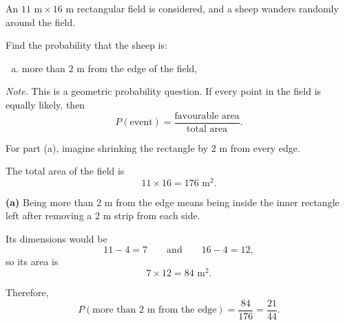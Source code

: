 \begin{problem}
An $11\text{ m}\times 16\text{ m}$ rectangular field is considered, and a sheep wanders randomly around the field.

Find the probability that the sheep is:
\begin{enumerate}[(a)]
  \item more than $2\text{ m}$ from the edge of the field,
\end{enumerate}

\noindent\textit{Note.} This is a geometric probability question. If every point in the field is equally likely, then
\[
P(\text{event})=\frac{\text{favourable area}}{\text{total area}}.
\]

\begin{center}
\end{center}
\end{problem}

\begin{hint}
For part (a), imagine shrinking the rectangle by $2\text{ m}$ from every edge.
\end{hint}

\begin{solution}
The total area of the field is
\[
11\times 16=176\text{ m}^2.
\]

\textbf{(a)} Being more than $2\text{ m}$ from the edge means being inside the inner rectangle left after removing a $2\text{ m}$ strip from each side.

Its dimensions would be
\[
11-4=7
\qquad \text{and} \qquad
16-4=12,
\]
so its area is
\[
7\times 12=84\text{ m}^2.
\]

Therefore,
\[
P(\text{more than }2\text{ m from the edge})=\frac{84}{176}=\frac{21}{44}.
\]
\end{solution}

